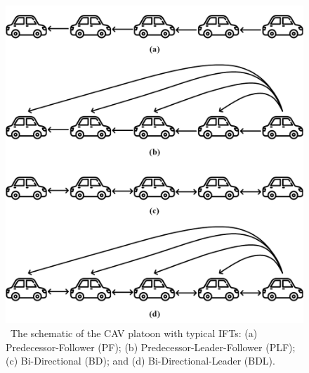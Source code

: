 \documentclass[a4paper]{cas-sc}
\begin{document}
\begin{figure}
  \centering

  \includegraphics[width=12cm]{figs/fig1.png}
  \caption{~The schematic of the CAV platoon with typical IFTs: (a) Predecessor-Follower (PF); (b) Predecessor-Leader-Follower (PLF); (c) Bi-Directional (BD); and (d) Bi-Directional-Leader (BDL).}
  \label{fig1}
\end{figure}
\end{document}
